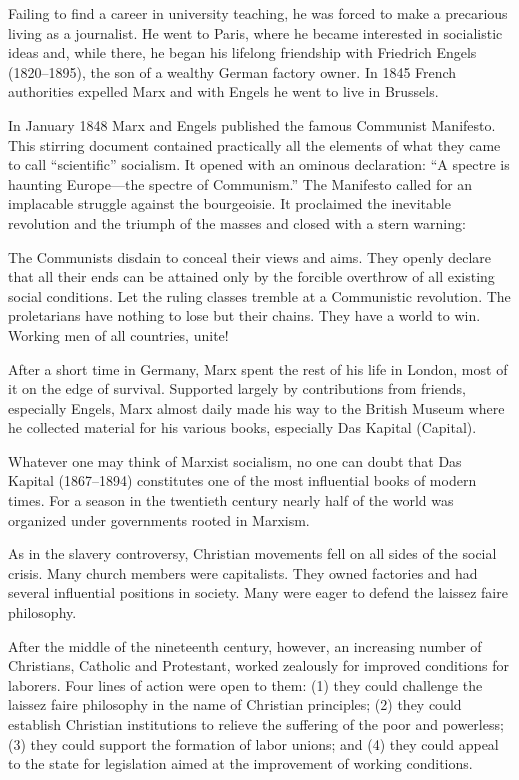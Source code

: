 \begin{blockquote}
Failing to find a career in university teaching, he was forced to make a precarious living as a
journalist. He went to Paris, where he became interested in socialistic ideas and, while there, he
began his lifelong friendship with Friedrich Engels (1820–1895), the son of a wealthy German factory
owner. In 1845 French authorities expelled Marx and with Engels he went to live in Brussels.
\end{blockquote}

In January 1848 Marx and Engels published the famous Communist Manifesto. This stirring document
contained practically all the elements of what they came to call “scientific” socialism. It opened
with an ominous declaration: “A spectre is haunting Europe—the spectre of Communism.” The Manifesto
called for an implacable struggle against the bourgeoisie. It proclaimed the inevitable revolution
and the triumph of the masses and closed with a stern warning:

\begin{blockquote}
The Communists disdain to conceal their views and aims. They openly declare that all their ends can
be attained only by the forcible overthrow of all existing social conditions. Let the ruling classes
tremble at a Communistic revolution. The proletarians have nothing to lose but their chains. They
have a world to win. Working men of all countries, unite!
\end{blockquote}

After a short time in Germany, Marx spent the rest of his life in London, most of it on the edge of
survival. Supported largely by contributions from friends, especially Engels, Marx almost daily made
his way to the British Museum where he collected material for his various books, especially Das
Kapital (Capital).

Whatever one may think of Marxist socialism, no one can doubt that Das Kapital (1867–1894)
constitutes one of the most influential books of modern times. For a season in the twentieth century
nearly half of the world was organized under governments rooted in Marxism.

As in the slavery controversy, Christian movements fell on all sides of the social crisis. Many
church members were capitalists. They owned factories and had several influential positions in
society. Many were eager to defend the laissez faire philosophy.

After the middle of the nineteenth century, however, an increasing number of Christians, Catholic
and Protestant, worked zealously for improved conditions for laborers. Four lines of action were
open to them: (1) they could challenge the laissez faire philosophy in the name of Christian
principles; (2) they could establish Christian institutions to relieve the suffering of the poor and
powerless; (3) they could support the formation of labor unions; and (4) they could appeal to the
state for legislation aimed at the improvement of working conditions.

